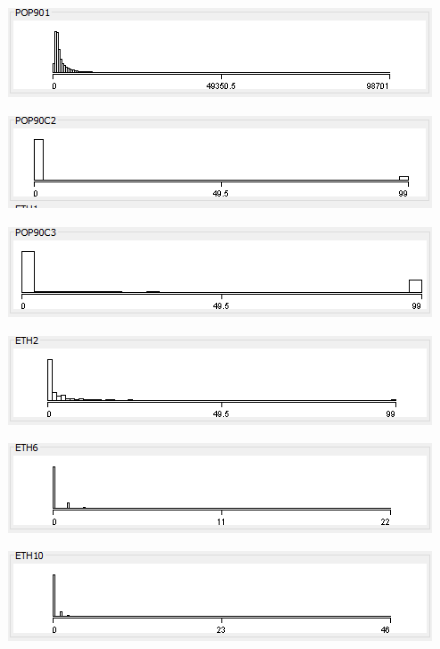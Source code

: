 \begin{figure}
\includegraphics{./images/expl_rep/Cattura2-03-08}
\end{figure}
\begin{figure}
\includegraphics{./images/expl_rep/Cattura2-03-09}
\end{figure}
\begin{figure}
\includegraphics{./images/expl_rep/Cattura3-0-0}
\end{figure}
\begin{figure}
\includegraphics{./images/expl_rep/Cattura3-0-1}
\end{figure}
\begin{figure}
\includegraphics{./images/expl_rep/Cattura3-0-2}
\end{figure}
\begin{figure}
\includegraphics{./images/expl_rep/Cattura3-0-3}
\end{figure}

